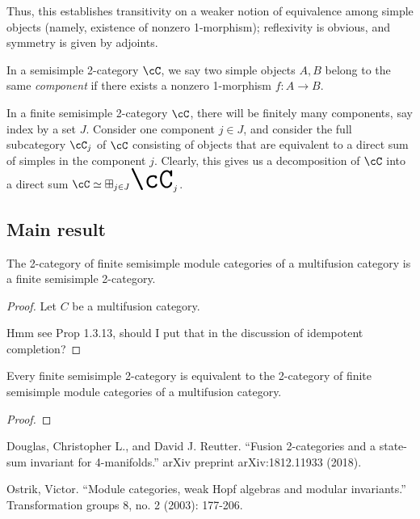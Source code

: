 \documentclass[12pt]{article}
\newcommand{\bigboxplus}{\Huge \boxplus}
\begin{document}
Thus, this establishes transitivity on a weaker notion
of equivalence among simple objects
(namely, existence of nonzero 1-morphism);
reflexivity is obvious,
and symmetry is given by adjoints.

\begin{definition}
In a semisimple 2-category $\cC$,
we say two simple objects $A,B$ belong to the same
\emph{component} if there exists a nonzero 1-morphism
$f: A \to B$.
\end{definition}


In a finite semisimple 2-category $\cC$,
there will be finitely many components,
say index by a set $J$.
Consider one component $j \in J$,
and consider the full subcategory $\cC_j$ of $\cC$
consisting of objects that are equivalent
to a direct sum of simples in the component $j$.
Clearly, this gives us a decomposition of $\cC$ into a direct sum
$\cC \simeq \bigboxplus_{j \in J} \cC_j$.


\subsection{Main result}

\begin{theorem}
The 2-category of finite semisimple module categories
of a multifusion category
is a finite semisimple 2-category.
\end{theorem}

\begin{proof}
Let $C$ be a multifusion category.

Hmm see Prop 1.3.13, should I put that in the discussion
of idempotent completion?
\end{proof}


\begin{theorem}
Every finite semisimple 2-category is equivalent to
the 2-category of finite semisimple module categories
of a multifusion category.
\end{theorem}

\begin{proof}
\end{proof}


\begin{thebibliography}{1}

 Douglas, Christopher L., and David J. Reutter. ``Fusion
2-categories and a state-sum invariant for 4-manifolds.'' arXiv preprint arXiv:1812.11933 (2018).

 Ostrik, Victor. ``Module categories, weak Hopf algebras and
modular invariants.'' Transformation groups 8, no. 2 (2003): 177-206.

\end{thebibliography}
\end{document}
